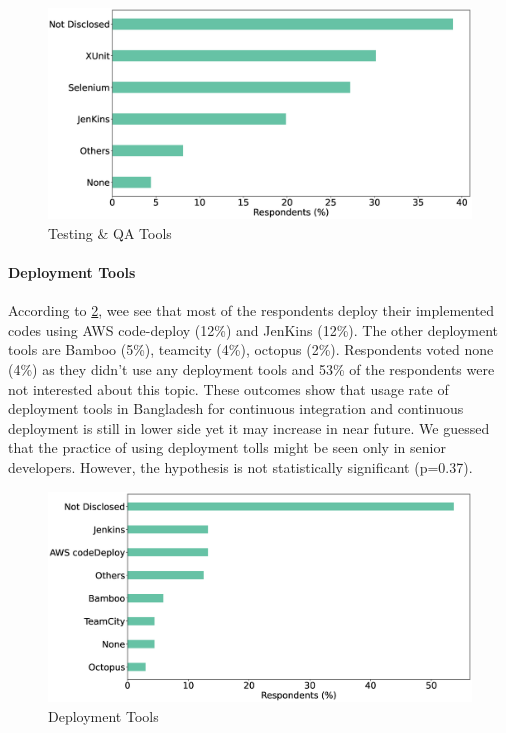 \begin{figure}[h]
\centering
  \includegraphics[scale=0.18]{Figures/Respondents_testing_tools}
  \caption{Testing \& QA Tools}
  \label{fig:testingTools}
\end{figure}



\paragraph{Deployment Tools}
According to \ref{fig:deployTools}, wee see that most of the respondents deploy their implemented codes using AWS code-deploy (12\%) and JenKins (12\%). The other deployment tools are Bamboo (5\%), teamcity (4\%), octopus (2\%). Respondents voted none (4\%) as they didn’t use any deployment tools and 53\% of the respondents were not interested about this topic. These outcomes show that usage rate of deployment tools in Bangladesh for continuous integration and continuous deployment is still in lower side yet it may increase in near future. We guessed that the practice of using deployment tolls might be seen only in senior developers. However, the hypothesis is not statistically significant (p=0.37).

\begin{figure}[h]
\centering
  \includegraphics[scale=0.18]{Figures/Respondents_deployment_tools}
  \caption{Deployment Tools}
  \label{fig:deployTools}
\end{figure}



